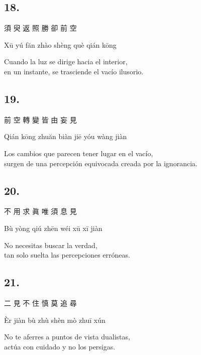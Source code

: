 \documentclass[
  a5paperpaper,
]{article}
\begin{document}
\begin{verseblock}

\hypertarget{section-92}{%
\subsection{18.}\label{section-92}}

須 臾 返 照 勝 卻 前 空

Xū yú făn zhào shèng què qián kōng

Cuando la luz se dirige hacia el interior,\\
en un instante, se trasciende el vacío ilusorio.

\end{verseblock}

\begin{verseblock}

\hypertarget{section-93}{%
\subsection{19.}\label{section-93}}

前 空 轉 變 皆 由 妄 見

Qián kōng zhuăn biàn jiē yóu wàng jiàn

Los cambios que parecen tener lugar en el vacío,\\
surgen de una percepción equivocada creada por la ignorancia.

\end{verseblock}

\begin{verseblock}

\hypertarget{section-94}{%
\subsection{20.}\label{section-94}}

不 用 求 眞 唯 須 息 見

Bù yòng qiú zhēn wéi xū xī jiàn

No necesitas buscar la verdad,\\
tan solo suelta las percepciones erróneas.

\end{verseblock}

\begin{verseblock}

\hypertarget{section-95}{%
\subsection{21.}\label{section-95}}

二 見 不 住 慎 莫 追 尋

Èr jiàn bù zhù shèn mò zhuī xún

No te aferres a puntos de vista dualistas,\\
actúa con cuidado y no los persigas.

\end{verseblock}
\end{document}
